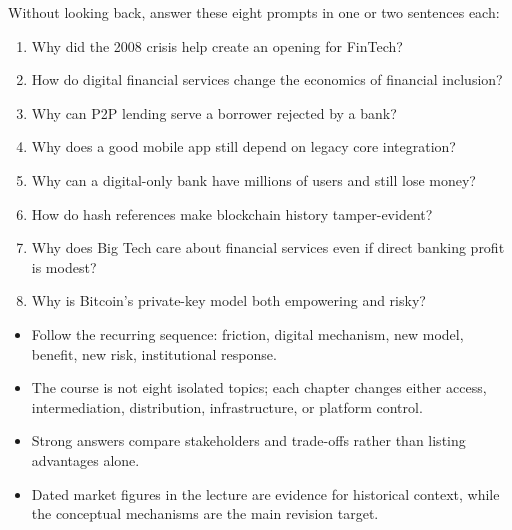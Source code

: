 \begin{quickcheck}
Without looking back, answer these eight prompts in one or two sentences each:
\begin{enumerate}
  \item Why did the 2008 crisis help create an opening for FinTech?
  \item How do digital financial services change the economics of financial inclusion?
  \item Why can P2P lending serve a borrower rejected by a bank?
  \item Why does a good mobile app still depend on legacy core integration?
  \item Why can a digital-only bank have millions of users and still lose money?
  \item How do hash references make blockchain history tamper-evident?
  \item Why does Big Tech care about financial services even if direct banking profit is modest?
  \item Why is Bitcoin's private-key model both empowering and risky?
\end{enumerate}
\end{quickcheck}

\begin{chapterrecap}
\begin{itemize}
  \item Follow the recurring sequence: friction, digital mechanism, new model, benefit, new risk, institutional response.
  \item The course is not eight isolated topics; each chapter changes either access, intermediation, distribution, infrastructure, or platform control.
  \item Strong answers compare stakeholders and trade-offs rather than listing advantages alone.
  \item Dated market figures in the lecture are evidence for historical context, while the conceptual mechanisms are the main revision target.
\end{itemize}
\end{chapterrecap}
